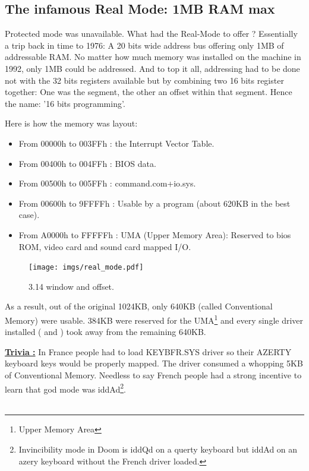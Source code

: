 \documentclass[book.tex]{subfiles}
\begin{document}
  \subsection{The infamous Real Mode: 1MB RAM max}
  Protected mode was unavailable. What had the Real-Mode to offer ? Essentially a trip back in time to 1976: A 20 bits wide address bus offering only 1MB of addressable RAM. No matter how much memory was installed on the machine in 1992, only 1MB could be addressed. And to top it all, addressing had to be done not with the 32 bits registers available but by combining two 16 bits register together: One was the segment, the other an offset within that segment. Hence the name: '16 bits programming'.

  \bigskip
Here is how the memory was layout: \\
\begin{itemize}
\item From 00000h to 003FFh : the Interrupt Vector Table.
\item From 00400h to 004FFh : BIOS data.
\item From 00500h to 005FFh : command.com+io.sys.
\item From 00600h to 9FFFFh : Usable by a program (about 620KB in the best case). 
\item From A0000h to FFFFFh : UMA (Upper Memory Area): Reserved to bios ROM, video card and sound card mapped I/O.
\end{itemize}

\begin{figure}[H]
\centering
\texttt{[image: imgs/real\_mode.pdf]}

\caption{3.14 window and offset.}
\label{fig:fp_internals}
\end{figure}


As a result, out of the original 1024KB, only 640KB (called Conventional Memory) were usable. 384KB were reserved for the UMA\footnote{Upper Memory Area} and every single driver installed ( and )  took away from the remaining 640KB.

\bigskip

\textbf{\underline{Trivia :}}  In France people had to load KEYBFR.SYS driver so their AZERTY keyboard keys would be properly mapped. The driver consumed a whopping 5KB of Conventional Memory. Needless to say French people had a strong incentive to learn that god mode was iddAd\footnote{Invincibility mode in Doom is iddQd on a querty keyboard but iddAd on an azery keyboard without the French driver loaded.}.\\
\\
\end{document}
